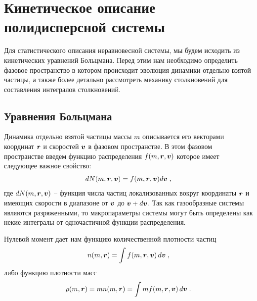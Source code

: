 \chapter{Кинетическое описание полидисперсной системы}
\label{cha:analysis}

Для статистического описания неравновесной системы, мы будем исходить из кинетических уравнений Больцмана.
Перед этим нам необходимо определить фазовое пространство в котором происходит эволюция динамики отдельно
взятой частицы, а также более детально рассмотреть механику столкновений для составления интегралов столкновений.

\section{Уравнения Больцмана}

Динамика отдельно взятой частицы массы $m$ описывается его векторами координат $\bm{r}$ и скоростей $\bm{v}$ в фазовом пространстве.
В этом фазовом пространстве введем функцию распределения $f(m,\bm{r},\bm{v})$ которое имеет следующее важное свойство:
\begin{equation}
  dN(m,\bm{r},\bm{v}) = f(m, \bm{r}, \bm{v})d\bm{v}\;,
\end{equation}
где $dN(m, \bm{r}, \bm{v})$ -- функция числа частиц локализованных вокруг координаты $\bm{r}$ и имеющих скорости в диапазоне от
$\bm{v}$ до $\bm{v}+d\bm{v}$. 
Так как газообразные системы являются разряженными, то макропараметры системы могут быть определены как
некие интегралы от одночастичной функции распределения. 

Нулевой момент дает нам функцию количественной плотности частиц
\begin{equation}
  n(m,\bm{r}) = \int f(m,\bm{r},\bm{v})\,d\bm{v}\;,
\end{equation}
либо функцию плотности масс
\begin{equation}
  \rho(m,\bm{r}) = mn(m,\bm{r})=\int mf(m,\bm{r},\bm{v})\,d\bm{v}\;.
\end{equation}


